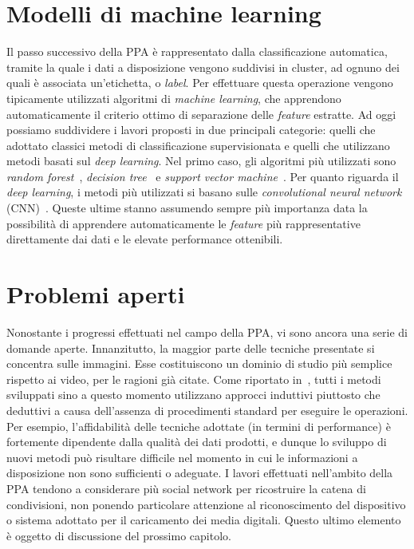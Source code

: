 \section{Modelli di machine learning}
\label{sec:ml_model}
Il passo successivo della PPA è rappresentato dalla classificazione automatica, tramite la quale i dati a disposizione vengono suddivisi in cluster, ad ognuno dei quali è associata un'etichetta, o \textit{label}. Per effettuare questa operazione vengono tipicamente utilizzati algoritmi di \textit{machine learning}, che apprendono automaticamente il criterio ottimo di separazione delle \textit{feature} estratte. Ad oggi possiamo suddividere i lavori proposti in due principali categorie: quelli che adottato classici metodi di classificazione supervisionata e quelli che utilizzano metodi basati sul \textit{deep learning}. Nel primo caso, gli algoritmi più utilizzati sono \textit{random forest}~\cite{phan2018identifying, mullan2019forensic, caldelli2017image, verde2021multi}, \textit{decision tree}~\cite{giudice2017classification} e \textit{support vector machine}~\cite{phan2018identifying}. Per quanto riguarda il \textit{deep learning}, i metodi più utilizzati si basano sulle \textit{convolutional neural network} (CNN)~\cite{amerini2019social, amerini2017tracing, phan2019tracking}. Queste ultime stanno assumendo sempre più importanza data la possibilità di apprendere automaticamente le \textit{feature} più rappresentative direttamente dai dati e le elevate performance ottenibili.

\section{Problemi aperti}
\label{sec:cosa_rimane_da_fare}
Nonostante i progressi effettuati nel campo della PPA, vi sono ancora una serie di domande aperte. Innanzitutto, la maggior parte delle tecniche presentate si concentra sulle immagini. Esse costituiscono un dominio di studio più semplice rispetto ai video, per le ragioni già citate. Come riportato in~\cite{pasquini2021media}, tutti i metodi sviluppati sino a questo momento utilizzano approcci induttivi piuttosto che deduttivi a causa dell'assenza di procedimenti standard per eseguire le operazioni. Per esempio, l'affidabilità delle tecniche adottate (in termini di performance) è fortemente dipendente dalla qualità dei dati prodotti, e dunque lo sviluppo di nuovi metodi può risultare difficile nel momento in cui le informazioni a disposizione non sono sufficienti o adeguate. I lavori effettuati nell'ambito della PPA tendono a considerare più social network per ricostruire la catena di condivisioni, non ponendo particolare attenzione al riconoscimento del dispositivo o sistema adottato per il caricamento dei media digitali. Questo ultimo elemento è oggetto di discussione del prossimo capitolo.



